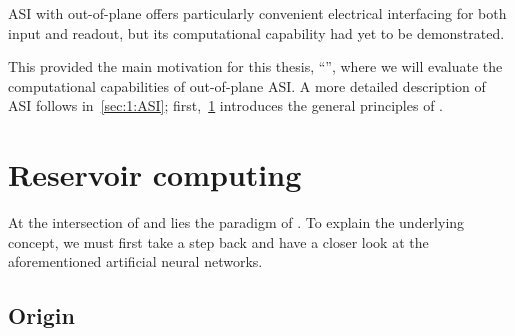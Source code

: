 ASI with out-of-plane  offers particularly convenient electrical interfacing for both input and readout, but its computational capability had yet to be demonstrated. \par %
This provided the main motivation for this thesis, ``\!\emph{\phdtitle}'', where we will evaluate the computational capabilities of out-of-plane ASI.
A more detailed description of ASI follows in~\cref{sec:1:ASI}; first,~\cref{sec:1:RC} introduces the general principles of .

\newpage
\section{Reservoir computing}\label{sec:1:RC}
At the intersection of  and  lies the paradigm of .
To explain the underlying concept, we must first take a step back and have a closer look at the aforementioned artificial neural networks.

\subsection{Origin}
